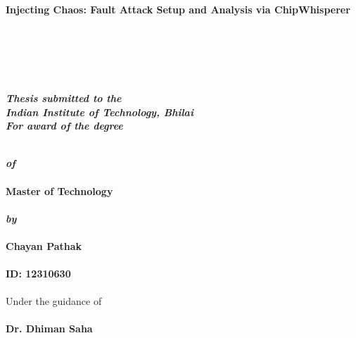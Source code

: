 \thispagestyle{empty}
\vspace{-15mm}
\begin{center}
	\begin{Spacing}{1.5}
    \textbf{\Large Injecting Chaos: Fault Attack Setup and Analysis via ChipWhisperer} \\
   	\end{Spacing}
	\hspace{0pt plus 1filll} \\
	\hspace{0pt plus 1filll} \\
	\hspace{0pt plus 1filll} \\
	\hspace{0pt plus 1filll} \\
	\begin{Spacing}{1.4}
    \textbf{\emph{ Thesis submitted to the}} \\ 
   	\textbf{\emph{ Indian Institute of Technology, Bhilai}}\\
   	\textbf{\emph{ For award of the degree}}\\
   	\end{Spacing}
	\hspace{0pt plus 1filll} \\
    \textbf{ \emph{of}}\\
	\hspace{0pt plus 1filll} \\
    \textbf{ Master of Technology}\\
	\hspace{0pt plus 1filll} \\
    \textbf{\emph{ by}}\\
	\hspace{0pt plus 1filll} \\
    \textbf{ Chayan Pathak}\\
	\hspace{0pt plus 1filll} \\
	\textbf{ ID: 12310630}\\
	\hspace{0pt plus 1filll} \\
    { Under the guidance of}\\
	\hspace{0pt plus 1filll} \\
    \textbf{ Dr. Dhiman Saha} 
    \begin{figure}[h]
    \centering

\end{figure}
\end{center}
